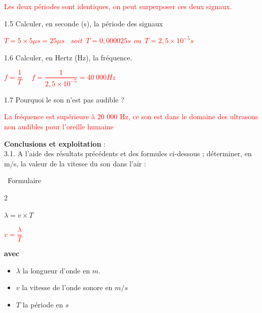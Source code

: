 \documentclass[11pt,a4paper]{article}
\begin{document}
\begin{center}
    \textcolor{red}{Les deux périodes sont identiques, on peut surperposer ces deux signaux.} 
\end{center} 


1.5 Calculer, en seconde (s), la période des signaux \\[2pt]
\begin{center}
    \textcolor{red}{$T = 5 \times 5 \mu s = 25 \mu s ~~~~soit~~ T = 0,000025 s~~ ou ~~T = 2,5 \times 10^{-5} s$} 
\end{center} 

1.6 Calculer, en Hertz (Hz), la fréquence.\\[2pt]
\begin{center}
    \textcolor{red}{$f=\dfrac{1}{T} ~~~~~~ f=\dfrac{1}{2,5 \times 10^{-5}} = 40~000 Hz$} 
\end{center} 



1.7 Pourquoi le son n'est pas audible ?\\[2pt]
\begin{center}
    \textcolor{red}{La fréquence est supérieure à 20 000 Hz, ce son est dans le domaine des ultrasons non audibles pour l'oreille humaine} 
\end{center} 


 \textbf{Conclusions et exploitation} : \\[2pt]
3.1. A l'aide des résultats précédents et des formules ci-dessous ; déterminer, en m/s, la valeur de la vitesse du son dans l'air :\\[2pt]
\begin{bclogo}[logo=\bcinfo,arrondi=.1,couleur=gray!10,barre=snake,ombre = true, epOmbre = 0.15, couleurOmbre = black!30]{~Formulaire}
   \begin{multicols}{2}
        \begin{center}
        \LARGE{$\lambda= v \times T$}
        
        \vspace{2 mm}
        
    \textcolor{red}{\LARGE{$v = \dfrac{\lambda}{T} $}} 
         \vspace{5mm}

        
        
        \end{center}
   
        
 
      \textbf{avec } 
      \begin{itemize}
      \item[$\bullet$] $\lambda$ la longueur d'onde en $m$.
      
      \item[$\bullet$] $v$ la vitesse de l'onde sonore en $m/s$ 
      
      \item[$\bullet$] $T$ la période en $s$
      \end{itemize}
      \vspace{5mm}
    \end{multicols}
\end{bclogo}
\end{document}
